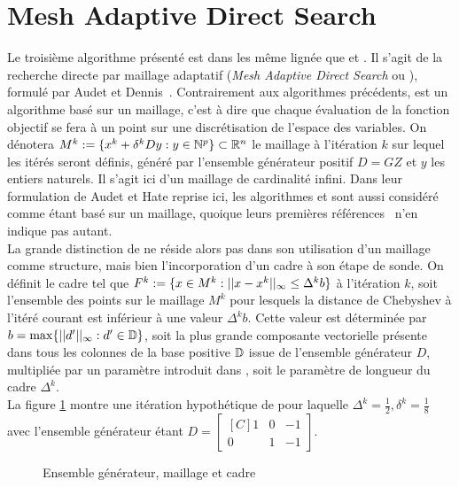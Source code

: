 \section{Mesh Adaptive Direct Search}\label{sec:mad}
Le troisième algorithme présenté est dans les même lignée que \CS et \GPS. Il s'agit de la recherche directe par maillage adaptatif (\emph{Mesh Adaptive Direct Search} ou \MADS), formulé par Audet et Dennis~\cite{AuDe2006}. Contrairement aux algorithmes précédents, \MADS est un algorithme basé sur un maillage, c'est à dire que chaque évaluation de la fonction objectif se fera à un point sur une discrétisation de l'espace des variables. On dénotera $M^k:=\{x^k + \delta^kDy : y \in \mathbb{N}^p\} \subset \mathbb{R}^n$ le maillage à l'itération $k$ sur lequel les itérés seront définis, généré par l'ensemble générateur positif $D = GZ$ et $y$ les entiers naturels. Il s'agit ici d'un maillage de cardinalité infini. Dans leur formulation de Audet et Hate reprise ici, les algorithmes \CS et \GPS sont aussi considéré comme étant basé sur un maillage, quoique leurs premières références~\cite{HoJe61a,Torc97a} n'en indique pas autant.\\
La grande distinction de \MADS ne réside alors pas dans son utilisation d'un maillage comme structure, mais bien l'incorporation d'un cadre à son étape de sonde. On définit le cadre tel que $F^k:=\{x\in M^k : ||x-x^k||_{\infty} \leq \Delta^k b \}$ à l'itération $k$, soit l'ensemble des points sur le maillage $M^k$ pour lesquels la distance de Chebyshev à l'itéré courant est inférieur à une valeur $\Delta ^k b$. Cette valeur est déterminée par $b = \max\{||d'||_{\infty}:d' \in \mathbb{D}\}$, soit la plus grande composante vectorielle présente dans tous les colonnes de la base positive $\mathbb{D}$ issue de l'ensemble générateur $D$, multipliée par un paramètre introduit dans \MADS, soit le paramètre de longueur du cadre $\Delta^k$.\\
La figure \ref{fig:MADS} montre une itération hypothétique de \MADS pour laquelle $\Delta^k = \frac{1}{2}, \delta^k = \frac{1}{8}$ avec l'ensemble générateur étant
$D = \begin{bmatrix*}[C]
1 & 0 &-1\\
0 & 1 & -1
\end{bmatrix*}$. \\
\begin{figure}[H] %
	\begin{center}
	\end{center}
	\caption{Ensemble générateur, maillage et cadre}
	\label{fig:MADS}
\end{figure}
